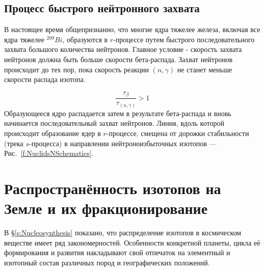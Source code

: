 \documentclass[a5paper,openany]{book}
\begin{document}
\subsection{Процесс быстрого нейтронного захвата} 

В настоящее время общепризнанно, что многие ядра тяжелее железа, включая все ядра тяжелее $^{209}Bi$, образуются в $r$-процессе путем быстрого последовательного захвата большого количества нейтронов. Главное условие - скорость захвата нейтронов должна быть больше скорости бета-распада. Захват нейтронов происходит до тех пор, пока скорость реакции $(n, \gamma)$ не станет меньше скорости распада изотопа. 

\begin{equation}\label{rprocess}
	\frac{\tau_{\beta}} {\tau_{(n, \gamma)}}  >  1 
\end{equation}
Образующееся ядро распадается затем в результате бета-распада и вновь начинается последовательный захват нейтронов.
Линия, вдоль которой происходит образование ядер в $r$-процессе, смещена от дорожки стабильности (трека $s$-процесса) в направлении нейтроноизбыточных изотопов --- Рис.~\ref{f:NuclidsNSchematics}.

\section{Распространённость изотопов на Земле и их фракционирование}\label{s:IsotopeCounts}

В \S\ref{s:Nucleosynthesis} показано, что распределение изотопов в космическом веществе имеет ряд закономерностей. Особенности конкретной планеты, цикла её формирования и развития накладывают свой отпечаток на элементный и изотопный состав различных пород и географических положений. 
\end{document}
